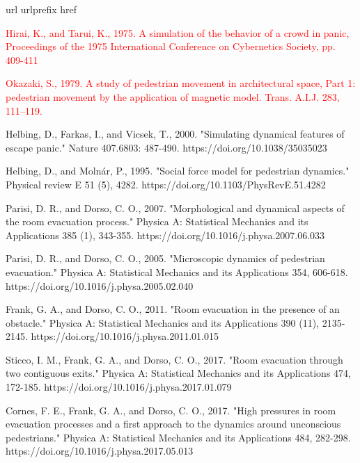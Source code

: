\documentclass[preprint,12pt]{elsarticle}
\begin{document}
\begin{thebibliography}{10}
\expandafter\ifx\csname url\endcsname\relax
  \def\url#1{\texttt{#1}}\fi
\expandafter\ifx\csname urlprefix\endcsname\relax\def\urlprefix{URL }\fi
\expandafter\ifx\csname href\endcsname\relax
  \def\href#1#2{#2} \def\path#1{#1}\fi

\textcolor{red}{Hirai, K., and Tarui, K., 1975. A simulation of the behavior of 
a crowd in panic, Proceedings of the 1975 International
Conference on Cybernetics Society, pp. 409-411}
  
\textcolor{red}{Okazaki, S., 1979. A study of pedestrian movement in 
architectural space, Part 
1: pedestrian movement by the application of magnetic model. Trans. A.I.J. 283, 
111–119.}

Helbing, D., Farkas, I., and Vicsek, T., 2000. "Simulating dynamical 
features of escape panic." Nature 407.6803: 487-490. 
{\path{https://doi.org/10.1038/35035023}}

Helbing, D., and Moln\'ar, P., 1995. "Social force model for pedestrian 
dynamics." Physical review E 51 (5), 4282. 
{\path{https://doi.org/10.1103/PhysRevE.51.4282}}

Parisi, D. R., and Dorso, C. O., 2007. "Morphological and dynamical 
aspects of the room evacuation process." Physica A: Statistical Mechanics and 
its Applications 385 (1), 343-355. 
{\path{https://doi.org/10.1016/j.physa.2007.06.033}}

Parisi, D. R., and Dorso, C. O., 2005. "Microscopic dynamics of pedestrian 
evacuation." Physica A: Statistical Mechanics and its Applications 354, 
606-618. {\path{https://doi.org/10.1016/j.physa.2005.02.040}}

Frank, G. A., and Dorso, C. O., 2011. "Room evacuation in 
the presence of an obstacle." Physica A: Statistical Mechanics and its 
Applications 390 (11), 2135-2145. 
{\path{https://doi.org/10.1016/j.physa.2011.01.015}}

Sticco, I. M., Frank, G. A., and Dorso, C. O., 2017. "Room evacuation 
through two contiguous exits." Physica A: Statistical Mechanics and its 
Applications 474, 172-185. 
{\path{https://doi.org/10.1016/j.physa.2017.01.079}}

Cornes, F. E., Frank, G. A., and Dorso, C. O., 2017. "High pressures in room 
evacuation processes and a first approach to the dynamics around unconscious 
pedestrians." Physica A: Statistical Mechanics and its Applications 484, 
282-298. {\path{https://doi.org/10.1016/j.physa.2017.05.013}}


\end{thebibliography}
\end{document}
